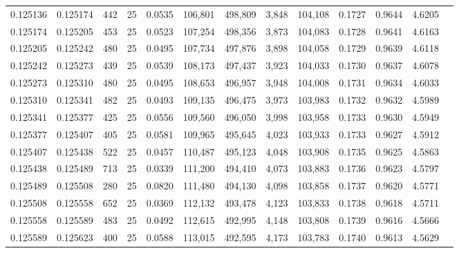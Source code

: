 \begin{tabular}{rrrrrrrrrrrrr}
0.125136 & 0.125174 &   442 &  25 &                                     0.0535 & 106,801 & 498,809 &   3,848 & 104,108 & 0.1727 & 0.9644 & 4.6205 \\
0.125174 & 0.125205 &   453 &  25 &                                     0.0523 & 107,254 & 498,356 &   3,873 & 104,083 & 0.1728 & 0.9641 & 4.6163 \\
0.125205 & 0.125242 &   480 &  25 &                                     0.0495 & 107,734 & 497,876 &   3,898 & 104,058 & 0.1729 & 0.9639 & 4.6118 \\
0.125242 & 0.125273 &   439 &  25 &                                     0.0539 & 108,173 & 497,437 &   3,923 & 104,033 & 0.1730 & 0.9637 & 4.6078 \\
0.125273 & 0.125310 &   480 &  25 &                                     0.0495 & 108,653 & 496,957 &   3,948 & 104,008 & 0.1731 & 0.9634 & 4.6033 \\
0.125310 & 0.125341 &   482 &  25 &                                     0.0493 & 109,135 & 496,475 &   3,973 & 103,983 & 0.1732 & 0.9632 & 4.5989 \\
0.125341 & 0.125377 &   425 &  25 &                                     0.0556 & 109,560 & 496,050 &   3,998 & 103,958 & 0.1733 & 0.9630 & 4.5949 \\
0.125377 & 0.125407 &   405 &  25 &                                     0.0581 & 109,965 & 495,645 &   4,023 & 103,933 & 0.1733 & 0.9627 & 4.5912 \\
0.125407 & 0.125438 &   522 &  25 &                                     0.0457 & 110,487 & 495,123 &   4,048 & 103,908 & 0.1735 & 0.9625 & 4.5863 \\
0.125438 & 0.125489 &   713 &  25 &                                     0.0339 & 111,200 & 494,410 &   4,073 & 103,883 & 0.1736 & 0.9623 & 4.5797 \\
0.125489 & 0.125508 &   280 &  25 &                                     0.0820 & 111,480 & 494,130 &   4,098 & 103,858 & 0.1737 & 0.9620 & 4.5771 \\
0.125508 & 0.125558 &   652 &  25 &                                     0.0369 & 112,132 & 493,478 &   4,123 & 103,833 & 0.1738 & 0.9618 & 4.5711 \\
0.125558 & 0.125589 &   483 &  25 &                                     0.0492 & 112,615 & 492,995 &   4,148 & 103,808 & 0.1739 & 0.9616 & 4.5666 \\
0.125589 & 0.125623 &   400 &  25 &                                     0.0588 & 113,015 & 492,595 &   4,173 & 103,783 & 0.1740 & 0.9613 & 4.5629 \\

\end{tabular}
